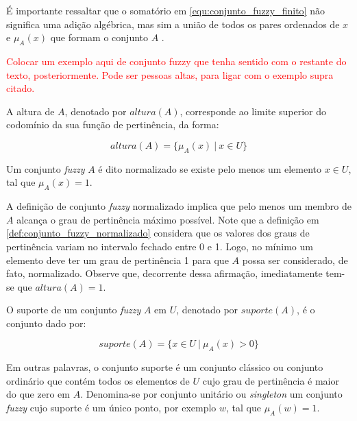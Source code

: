 É importante ressaltar que o somatório em \ref{equ:conjunto_fuzzy_finito} não significa uma adição algébrica, mas sim a união de todos os pares ordenados de $x$ e $\mu_A(x)$ que formam o conjunto $A$ \citep{klir:95}.

\begin{exmp}
\textcolor{red}{Colocar um exemplo aqui de conjunto fuzzy que tenha sentido com o restante do texto, posteriormente. Pode ser pessoas altas, para ligar com o exemplo supra citado.}
\end{exmp}

\begin{defn}
A altura de $A$, denotado por $altura(A)$, corresponde ao limite superior do codomínio da sua função de pertinência, da forma:

\begin{equation}
  altura(A) = \{\mu_A(x) \ |\ x \in U\}
\label{equ:conjunto_fuzzy_altura}
\end{equation}

\end{defn}

\begin{defn}
Um conjunto \emph{fuzzy} $A$ é dito normalizado se existe pelo menos um elemento $x \in U$, tal que $\mu_A(x) = 1$.
\label{def:conjunto_fuzzy_normalizado}
\end{defn}

A definição de conjunto \emph{fuzzy} normalizado implica que pelo menos um membro de $A$ alcança o grau de pertinência máximo possível. Note que a definição em \ref{def:conjunto_fuzzy_normalizado} considera que os valores dos graus de pertinência variam no intervalo fechado entre 0 e 1. Logo, no mínimo um elemento deve ter um grau de pertinência 1 para que $A$ possa ser considerado, de fato, normalizado. Observe que, decorrente dessa afirmação, imediatamente tem-se que $altura(A) = 1$.

\begin{defn}
O suporte de um conjunto \emph{fuzzy} $A$ em $U$, denotado por $suporte(A)$, é o conjunto dado por:

\begin{equation}
  suporte(A) = \{x \in U \ |\ \mu_A(x) > 0 \}
\label{equ:conjunto_fuzzy_suporte}
\end{equation}

\end{defn}

Em outras palavras, o conjunto suporte é um conjunto clássico ou conjunto ordinário que contém todos os elementos de $U$ cujo grau de pertinência é maior do que zero em $A$. Denomina-se por conjunto unitário ou \emph{singleton} um conjunto \emph{fuzzy} cujo suporte é um único ponto, por exemplo $w$, tal que $\mu_A(w) = 1$.

